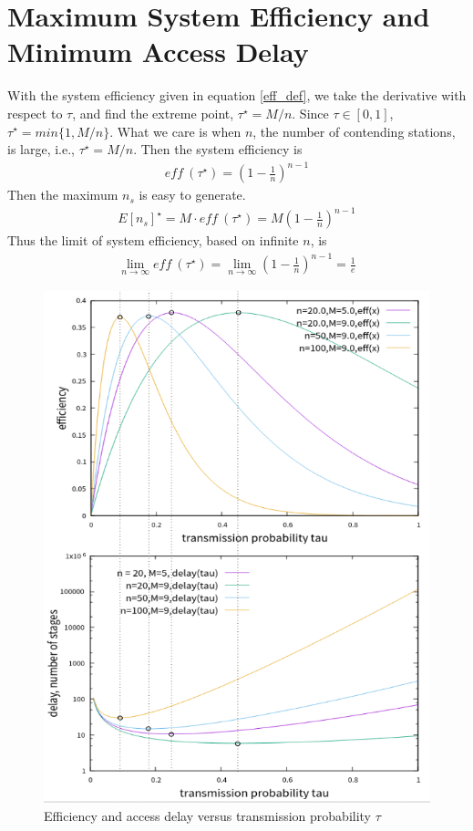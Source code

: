 \documentclass[journal]{IEEEtran}
\begin{document}
\section{Maximum System Efficiency and Minimum Access Delay} 	\label{sec_max_min}
With the system efficiency given in equation \ref{eff_def}, we take the derivative with respect to $\tau$, and find the extreme point, $\tau^\star = M/n$. Since $\tau\in [0,1]$, $\tau^\star = min\lbrace 1,M/n\rbrace$. 
What we care is when $n$, the number of contending stations, is large, i.e., $\tau^\star = M/n$. 
Then the system efficiency is
\begin{align}
\textit{eff}\ (\tau^\star) = (1-\frac{1}{n})^{n-1} 
\label{equ_max_eff}
\end{align}
Then the maximum $n_s$ is easy to generate.
\begin{align}
\label{equ_max_ns}
E[n_s]^\star = M \cdot \textit{eff}\ (\tau^\star) = M(1-\frac{1}{n})^{n-1} 
\end{align}
Thus the limit of system efficiency, based on infinite $n$, is
\begin{align}
\label{eff_limit}
\lim_{n\rightarrow \infty}\textit{eff}\ (\tau^\star) = \lim_{n\rightarrow \infty}(1-\frac{1}{n})^{n-1} =\frac{1}{e} 
\end{align}

\begin{figure}[!ht]
\includegraphics[scale=0.42]{./figure/chp4/max_min.png}
\caption{Efficiency and access delay versus transmission probability $\tau$}
\label{fig_eff_def}
\end{figure}
\end{document}

